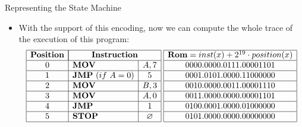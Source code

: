 \begin{frame}[allowframebreaks]{Representing the State Machine}
\begin{itemize}
\item With the support of this encoding, now we can compute the whole trace of the execution of this program:
\[
\begin{array}{|c|l|c|c|}
\hline
\mathbf{Position} & \multicolumn{2}{|c|}{\mathbf{Instruction}} \\ \hline
0 & \mathbf{MOV} & A, 7 \\ \hline
1 & \mathbf{JMP}~(if~A = 0) & 5 \\ \hline
2 & \mathbf{MOV} & B, 3 \\ \hline
3 & \mathbf{MOV} & A, 0 \\ \hline
4 & \mathbf{JMP} & 1 \\ \hline
5 & \mathbf{STOP} & \emptyset \\ \hline
\end{array}
\hspace{0.1cm}
\begin{array}{|c|c|}
\hline
\mathbf{Rom} = inst(x) + 2^{19} \cdot position(x) \\ \hline
0000.0000.0111.00001101 \\ \hline
0001.0101.0000.11000000 \\ \hline
0010.0000.0011.00001110 \\ \hline
0011.0000.0000.00001101 \\ \hline
0100.0001.0000.01000000 \\ \hline
0101.0000.0000.00000000 \\ \hline
\end{array}
\]


\end{itemize}
\end{frame}
